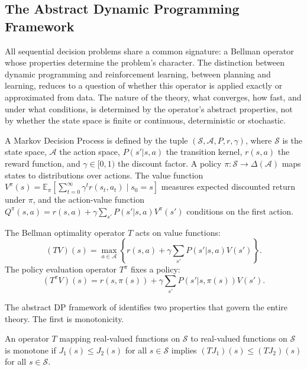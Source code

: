 
\subsection{The Abstract Dynamic Programming Framework}
\label{sec:abstract_dp}

All sequential decision problems share a common signature: a Bellman operator whose properties determine the problem's character. The distinction between dynamic programming and reinforcement learning, between planning and learning, reduces to a question of whether this operator is applied exactly or approximated from data. The nature of the theory, what converges, how fast, and under what conditions, is determined by the operator's abstract properties, not by whether the state space is finite or continuous, deterministic or stochastic.

A Markov Decision Process is defined by the tuple $(\mathcal{S}, \mathcal{A}, P, r, \gamma)$, where $\mathcal{S}$ is the state space, $\mathcal{A}$ the action space, $P(s'|s,a)$ the transition kernel, $r(s,a)$ the reward function, and $\gamma \in [0,1)$ the discount factor. A policy $\pi: \mathcal{S} \to \Delta(\mathcal{A})$ maps states to distributions over actions. The value function $V^\pi(s) = \mathbb{E}_\pi\left[\sum_{t=0}^{\infty} \gamma^t r(s_t, a_t) \mid s_0 = s\right]$ measures expected discounted return under $\pi$, and the action-value function $Q^\pi(s,a) = r(s,a) + \gamma \sum_{s'} P(s'|s,a) V^\pi(s')$ conditions on the first action.

The Bellman optimality operator $T$ acts on value functions:
\begin{equation}
(TV)(s) = \max_{a \in \mathcal{A}} \left\{ r(s,a) + \gamma \sum_{s'} P(s'|s,a) V(s') \right\}.
\label{eq:bellman_optimality}
\end{equation}
The policy evaluation operator $T^\pi$ fixes a policy:
\begin{equation}
(T^\pi V)(s) = r(s,\pi(s)) + \gamma \sum_{s'} P(s'|s,\pi(s)) V(s').
\label{eq:bellman_evaluation}
\end{equation}

The abstract DP framework of \citet{bertsekas2022} identifies two properties that govern the entire theory. The first is monotonicity.

\begin{definition}
\label{def:monotone_operator}
An operator $T$ mapping real-valued functions on $\mathcal{S}$ to real-valued functions on $\mathcal{S}$ is monotone if $J_1(s) \leq J_2(s)$ for all $s \in \mathcal{S}$ implies $(TJ_1)(s) \leq (TJ_2)(s)$ for all $s \in \mathcal{S}$.
\end{definition}

